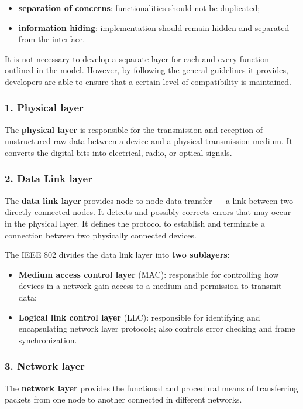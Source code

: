 \begin{itemize}
    \item \textbf{separation of concerns}: functionalities should not be duplicated;
    \item \textbf{information hiding}: implementation should remain hidden and separated from the interface.
\end{itemize}

It is not necessary to develop a separate layer for each and every function outlined in the model. However, by following the general guidelines it provides, developers are able to ensure that a certain level of compatibility is maintained.


\subsubsection*{1. Physical layer}
The \textbf{physical layer} is responsible for the transmission and reception of unstructured raw data between a device and a physical transmission medium. It converts the digital bits into electrical, radio, or optical signals.


\subsubsection*{2. Data Link layer}
The \textbf{data link layer} provides node-to-node data transfer — a link between two directly connected nodes. It detects and possibly corrects errors that may occur in the physical layer. It defines the protocol to establish and terminate a connection between two physically connected devices.

The IEEE 802 divides the data link layer into \textbf{two sublayers}:

\begin{itemize}
    \item \textbf{Medium access control layer} (MAC): responsible for controlling how devices in a network gain access to a medium and permission to transmit data;
    \item \textbf{Logical link control layer} (LLC): responsible for identifying and encapsulating network layer protocols; also controls error checking and frame synchronization.
\end{itemize}


\subsubsection*{3. Network layer}
The \textbf{network layer} provides the functional and procedural means of transferring packets from one node to another connected in different networks.


